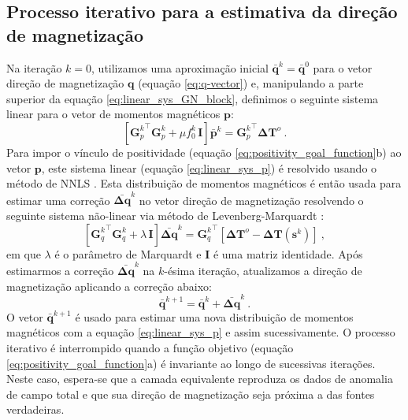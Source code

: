 \subsection{Processo iterativo para a estimativa da direção de magnetização}
\label{subsec:iterative-proccess}

Na iteração $k=0$, utilizamos uma aproximação inicial $\bar{\mathbf{q}}^{k} = \bar{\mathbf{q}}^{0}$ 
para o vetor direção de magnetização $\mathbf{q}$ (equação \ref{eq:q-vector}) e, manipulando a 
parte superior da equação \ref{eq:linear_sys_GN_block}, definimos o seguinte sistema linear 
para o vetor de momentos magnéticos $\mathbf{p}$:
\begin{equation}
\left[ {\mathbf{G}_{p}^{k}}^{\top} \mathbf{G}_{p}^{k} + 
\mu f_{0}^{k} \, \mathbf{I} \right] \bar{\mathbf{p}}^{k} = 
{\mathbf{G}_{p}^{k}}^{\top} \mathbf{\Delta T}^{o} \: .
\label{eq:linear_sys_p}
\end{equation}
Para impor o vínculo de positividade (equação \ref{eq:positivity_goal_function}b) ao vetor $\mathbf{p}$, este sistema 
linear (equação \ref{eq:linear_sys_p}) é resolvido usando o método de NNLS \citep{lawson_hanson_1974, silvadias_etal_2007}. 
Esta distribuição de momentos magnéticos é então usada para estimar uma correção $\bar{\mathbf{\Delta q}}^{k}$ no vetor 
direção de magnetização resolvendo o seguinte sistema não-linear via método de Levenberg-Marquardt 
\citep{aster2005}:
\begin{equation}
\left[ {\mathbf{G}_{q}^{k}}^{\top} \mathbf{G}_{q}^{k} + \lambda \, \mathbf{I} \right] 
\bar{\mathbf{\Delta q}}^{k} = {\mathbf{G}_{q}^{k}}^{\top} 
\left[ \mathbf{\Delta T}^{o} - \mathbf{\Delta T} (\mathbf{s}^{k}) \right] \: ,
\label{eq:linear_sys_q}
\end{equation}
em que $\lambda$ é o parâmetro de Marquardt e $\mathbf{I}$ é uma matriz identidade. Após estimarmos a correção 
$\bar{\mathbf{\Delta q}}^{k}$ na $k$-ésima iteração, atualizamos a direção de magnetização 
aplicando a correção abaixo:
\begin{equation}
\bar{\mathbf{q}}^{k+1} = \bar{\mathbf{q}}^{k} + \bar{\mathbf{\Delta q}}^{k} \: .
\label{eq:q_next}
\end{equation}
O vetor $\bar{\mathbf{q}}^{k+1}$ é usado para estimar uma nova distribuição de momentos magnéticos com a equação 
\ref{eq:linear_sys_p} e assim sucessivamente. O processo iterativo é interrompido quando a função objetivo 
(equação \ref{eq:positivity_goal_function}a) é invariante ao longo de sucessivas iterações. Neste 
caso, espera-se que a camada equivalente reproduza os dados de anomalia de campo total e 
que sua direção de magnetização seja próxima a das fontes verdadeiras.

